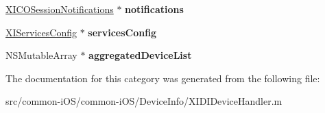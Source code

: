 \begin{DoxyCompactItemize}
\item 
\hypertarget{category_x_i_d_i_device_handler_07_08_a8fb1ade5dd8706cbc7251f681dd72862}{}\label{category_x_i_d_i_device_handler_07_08_a8fb1ade5dd8706cbc7251f681dd72862} 
\hyperlink{interface_x_i_c_o_session_notifications}{X\+I\+C\+O\+Session\+Notifications} $\ast$ {\bfseries notifications}
\item 
\hypertarget{category_x_i_d_i_device_handler_07_08_a9e073b872849ddf40e92e27a5fdba274}{}\label{category_x_i_d_i_device_handler_07_08_a9e073b872849ddf40e92e27a5fdba274} 
\hyperlink{interface_x_i_services_config}{X\+I\+Services\+Config} $\ast$ {\bfseries services\+Config}
\item 
\hypertarget{category_x_i_d_i_device_handler_07_08_a8bce2be2cb94183ec6e9898d3bb816ee}{}\label{category_x_i_d_i_device_handler_07_08_a8bce2be2cb94183ec6e9898d3bb816ee} 
N\+S\+Mutable\+Array $\ast$ {\bfseries aggregated\+Device\+List}
\end{DoxyCompactItemize}


The documentation for this category was generated from the following file\+:\begin{DoxyCompactItemize}
\item 
src/common-\/i\+O\+S/common-\/i\+O\+S/\+Device\+Info/X\+I\+D\+I\+Device\+Handler.\+m\end{DoxyCompactItemize}
